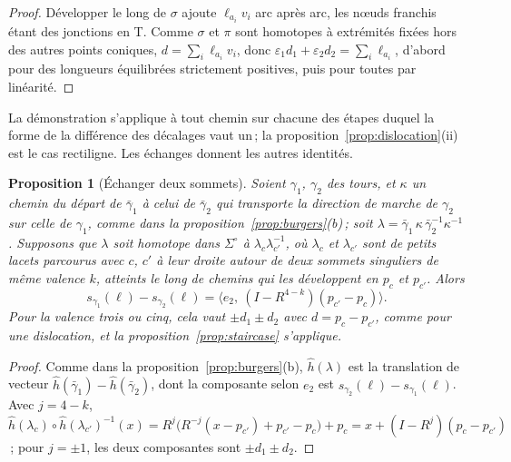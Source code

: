 \documentclass[11pt,a4paper]{article}
\newtheorem{proposition}{Proposition}
\newcommand{\shift}{s}
\newcommand{\lean}[1]{\texttt{\detokenize{#1}}}
\newenvironment{evidence}[3][]{}{}
\begin{document}
\begin{proof}
Développer le long de $\sigma$ ajoute $\ell_{a_i} v_i$ arc après arc, les
nœuds franchis étant des jonctions en T. Comme $\sigma$ et $\pi$ sont
homotopes à extrémités fixées hors des autres points coniques, $d = \sum_i
\ell_{a_i} v_i$, donc $\varepsilon_1 d_1 + \varepsilon_2 d_2 = \sum_i
\ell_{a_i}$, d'abord pour des longueurs équilibrées strictement positives,
puis pour toutes par linéarité.
\end{proof}

La démonstration s'applique à tout chemin sur chacune des étapes duquel la
forme de la différence des décalages vaut un\,; la
proposition~\ref{prop:dislocation}(ii) est le cas rectiligne. Les échanges
donnent les autres identités.

\begin{evidence}{core}{\lean{Motion.exchange}, \lean{exchange_quarter}\,; supposé~: l'homotopie entre les lacets}
\begin{proposition}[Échanger deux sommets]\label{prop:swap}
Soient $\gamma_1$, $\gamma_2$ des tours, et $\kappa$ un chemin du départ de
$\bar\gamma_1$ à celui de $\bar\gamma_2$ qui transporte la direction de marche
de $\gamma_2$ sur celle de $\gamma_1$, comme dans la
proposition~\ref{prop:burgers}(b)\,; soit $\lambda = \bar\gamma_1\, \kappa\,
\bar\gamma_2^{-1} \kappa^{-1}$. Supposons que $\lambda$ soit homotope dans
$\Sigma^\circ$ à $\lambda_c \lambda_{c'}^{-1}$, où $\lambda_c$ et
$\lambda_{c'}$ sont de petits lacets parcourus avec $c$, $c'$ à leur droite
autour de deux sommets singuliers de même valence $k$, atteints le long de
chemins qui les développent en $p_c$ et $p_{c'}$. Alors
\[
  \shift_{\gamma_1}(\ell) - \shift_{\gamma_2}(\ell) = \bigl\langle e_2,\
  (I - R^{4-k})(p_{c'} - p_c) \bigr\rangle .
\]
Pour la valence trois ou cinq, cela vaut $\pm d_1 \pm d_2$ avec $d = p_c -
p_{c'}$, comme pour une dislocation, et la proposition~\ref{prop:staircase}
s'applique.
\end{proposition}
\end{evidence}

\begin{proof}
Comme dans la proposition~\ref{prop:burgers}(b), $\hat h(\lambda)$ est la
translation de vecteur $\hat h(\bar\gamma_1) - \hat h(\bar\gamma_2)$, dont la
composante selon $e_2$ est $\shift_{\gamma_2}(\ell) - \shift_{\gamma_1}(\ell)$.
Avec $j = 4 - k$, $\hat h(\lambda_c) \circ \hat h(\lambda_{c'})^{-1}(x) =
R^j\bigl(R^{-j}(x - p_{c'}) + p_{c'} - p_c\bigr) + p_c = x + (I - R^j)(p_c -
p_{c'})$\,; pour $j = \pm1$, les deux composantes sont $\pm d_1 \pm d_2$.
\end{proof}
\end{document}
